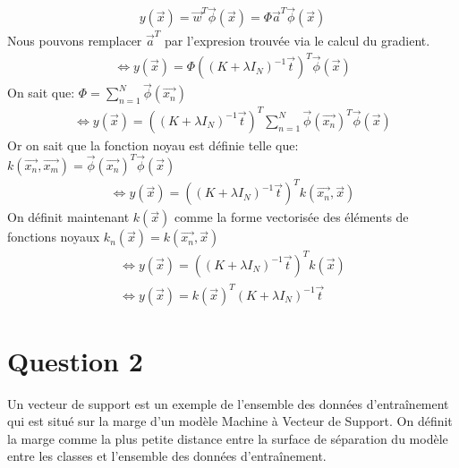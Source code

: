 \begin{equation}
\begin{split}
	y(\overrightarrow{x}) = \overrightarrow{w}^T \overrightarrow{\phi}(\overrightarrow{x}) = \Phi \overrightarrow{a}^T \overrightarrow{\phi}(\overrightarrow{x})
\end{split}
\end{equation}
Nous pouvons remplacer $\overrightarrow{a}^T$ par l'expresion trouvée via le calcul du gradient.
\begin{equation}
\begin{split}
	\iff y(\overrightarrow{x}) = \Phi \left((K + \lambda I_N)^{-1} \overrightarrow{t}\right)^T \overrightarrow{\phi}(\overrightarrow{x})
\end{split}
\end{equation}
On sait que: $\Phi = \sum_{n=1}^N \overrightarrow{\phi}(\overrightarrow{x_n})$
\begin{equation}
\begin{split}
	\iff y(\overrightarrow{x}) = \left((K + \lambda I_N)^{-1} \overrightarrow{t}\right)^T \sum_{n=1}^N \overrightarrow{\phi}(\overrightarrow{x_n})^T\overrightarrow{\phi}(\overrightarrow{x})
\end{split}
\end{equation}
Or on sait que la fonction noyau est définie telle que: $k(\overrightarrow{x_n}, \overrightarrow{x_m}) = \overrightarrow{\phi}(\overrightarrow{x_n})^T \overrightarrow{\phi}(\overrightarrow{x})$
\begin{equation}
\begin{split}
	\iff y(\overrightarrow{x}) = \left((K + \lambda I_N)^{-1} \overrightarrow{t}\right)^T k(\overrightarrow{x_n}, \overrightarrow{x})
\end{split}
\end{equation}
On définit maintenant $k(\overrightarrow{x})$ comme la forme vectorisée des éléments de fonctions noyaux $ k_n(\overrightarrow{x}) = k(\overrightarrow{x_n}, \overrightarrow{x}) $
\begin{equation}
\begin{split}
	\iff y(\overrightarrow{x}) = \left((K + \lambda I_N)^{-1} \overrightarrow{t}\right)^T k(\overrightarrow{x}) \\
	\iff y(\overrightarrow{x}) = k(\overrightarrow{x})^T (K+\lambda I_N)^{-1} \overrightarrow{t}
\end{split}
\end{equation}	

\section{Question 2}
Un vecteur de support est un exemple de l'ensemble des données d'entraînement qui est situé sur la marge d'un modèle Machine à Vecteur de Support. On définit la marge comme la plus petite distance entre la surface de séparation du modèle entre les classes et l'ensemble des données d'entraînement. 

